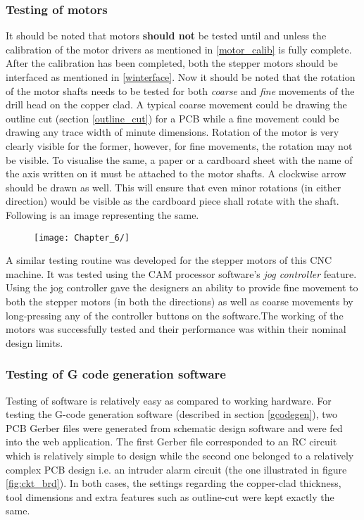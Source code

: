 \subsubsection*{Testing of motors}

It should be noted that motors \textbf{should not} be tested until and unless the calibration of the motor drivers as mentioned in \ref{motor_calib} is fully complete. After the calibration has been completed, both the stepper motors should be interfaced as mentioned in \ref{winterface}. Now it should be noted that the rotation of the motor shafts needs to be tested for both \textit{coarse} and \textit{fine} movements of the drill head on the copper clad. A typical coarse movement could be drawing the outline cut (section \ref{outline_cut}) for a PCB while a fine movement could be drawing any trace width of minute dimensions. Rotation of the motor is very clearly visible for the former, however, for fine movements, the rotation may not be visible. To visualise the same, a paper or a cardboard sheet with the name of the axis written on it must be attached to the motor shafts. A clockwise arrow should be drawn as well. This will ensure that even minor rotations (in either direction) would be visible as the cardboard piece shall rotate with the shaft. Following is an image representing the same. \par

\begin{figure}[h]
    \centering
    \texttt{[image: Chapter\_6/]}
    \caption{}
    \label{fig:}
\end{figure}

A similar testing routine was developed for the stepper motors of this CNC machine. It was tested using the CAM processor software’s \textit{jog controller} feature. Using the jog controller gave the designers an ability to provide fine movement to both the stepper motors (in both the directions) as well as coarse movements by long-pressing any of the controller buttons on the software.The working of the motors was successfully tested and their performance was within their nominal design limits.

\subsubsection*{Testing of G code generation software}

Testing of software is relatively easy as compared to working hardware. For testing the G-code generation software (described in section \ref{gcodegen}), two PCB Gerber files were generated from schematic design software and were fed into the web application. The first Gerber file corresponded to an RC circuit which is relatively simple to design while the second one belonged to a relatively complex PCB design i.e. an intruder alarm circuit (the one illustrated in figure \ref{fig:ckt_brd}). In both cases, the settings regarding the copper-clad thickness, tool dimensions and extra features such as outline-cut were kept exactly the same. \par

